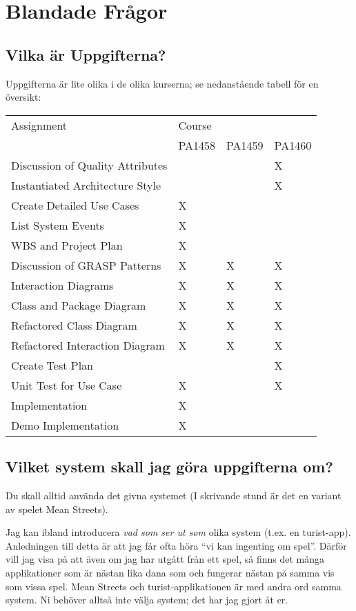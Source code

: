 \documentclass[8pt,oneside]{memoir}
\begin{document}
\part{Blandade Frågor}
\label{sec:org269fff1}
\chapter{Vilka är Uppgifterna?}
\label{sec:org8c22b67}
Uppgifterna är lite olika i de olika kurserna; se nedanstående tabell för en översikt:

\begin{scriptsize}

\begin{center}
\begin{tabular}{llll}
Assignment & Course &  & \\
 & PA1458 & PA1459 & PA1460\\
\hline
Discussion of Quality Attributes &  &  & X\\
Instantiated Architecture Style &  &  & X\\
Create Detailed Use Cases & X &  & \\
List System Events & X &  & \\
WBS and Project Plan & X &  & \\
Discussion of GRASP Patterns & X & X & X\\
Interaction Diagrams & X & X & X\\
Class and Package Diagram & X & X & X\\
Refactored Class Diagram & X & X & X\\
Refactored Interaction Diagram & X & X & X\\
Create Test Plan &  &  & X\\
Unit Test for Use Case & X &  & X\\
Implementation & X &  & \\
Demo Implementation & X &  & \\
\hline
\end{tabular}
\end{center}

\end{scriptsize}
\chapter{Vilket system skall jag göra uppgifterna om?}
\label{sec:org6da28eb}
Du skall alltid använda det givna systemet (I skrivande stund är det en variant av spelet Mean Streets).

Jag kan ibland introducera \emph{vad som ser ut som} olika system (t.ex. en turist-app). Anledningen till detta är att jag får ofta höra ``vi kan ingenting om spel''. Därför vill jag visa på att även om jag har utgått från ett spel, så finns det många applikationer som är nästan lika dana som och fungerar nästan på samma vis som vissa spel. Mean Streets och turist-applikationen är med andra ord samma system. Ni behöver alltså inte välja system; det har jag gjort åt er.
\end{document}
